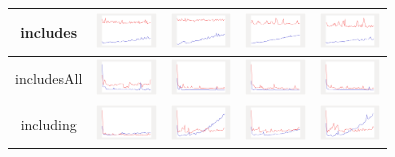 \begin{longtable}{ c|c c c c}
includes
&
\includegraphics[width=1.6cm]{../graphs/sequence/small/Includes}
&
\includegraphics[width=1.6cm]{../graphs/set/small/Includes}
&
\includegraphics[width=1.6cm]{../graphs/bag/small/Includes}
&
\includegraphics[width=1.6cm]{../graphs/orderedset/small/Includes}
\\\hline

includesAll
&
\includegraphics[width=1.6cm]{../graphs/sequence/small/IncludesAll}
&
\includegraphics[width=1.6cm]{../graphs/set/small/IncludesAll}
&
\includegraphics[width=1.6cm]{../graphs/bag/small/IncludesAll}
&
\includegraphics[width=1.6cm]{../graphs/orderedset/small/IncludesAll}
\\\hline

including
&
\includegraphics[width=1.6cm]{../graphs/sequence/small/Including}
&
\includegraphics[width=1.6cm]{../graphs/set/small/Including}
&
\includegraphics[width=1.6cm]{../graphs/bag/small/Including}
&
\includegraphics[width=1.6cm]{../graphs/orderedset/small/Including}
\\\hline


\end{longtable}
